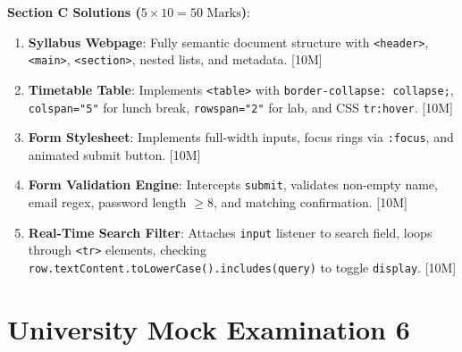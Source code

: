 \begin{solutionbox}
\medskip
\noindent\textbf{Section C Solutions ($5 \times 10 = 50\text{ Marks}$)}:
\begin{enumerate}[start=17]
    \item \textbf{Syllabus Webpage}: Fully semantic document structure with \texttt{<header>}, \texttt{<main>}, \texttt{<section>}, nested lists, and metadata. [10M]
    \item \textbf{Timetable Table}: Implements \texttt{<table>} with \texttt{border-collapse: collapse;}, \texttt{colspan="5"} for lunch break, \texttt{rowspan="2"} for lab, and CSS \texttt{tr:hover}. [10M]
    \item \textbf{Form Stylesheet}: Implements full-width inputs, focus rings via \texttt{:focus}, and animated submit button. [10M]
    \item \textbf{Form Validation Engine}: Intercepts \texttt{submit}, validates non-empty name, email regex, password length $\ge 8$, and matching confirmation. [10M]
    \item \textbf{Real-Time Search Filter}: Attaches \texttt{input} listener to search field, loops through \texttt{<tr>} elements, checking \texttt{row.textContent.toLowerCase().includes(query)} to toggle \texttt{display}. [10M]
\end{enumerate}
\end{solutionbox}

\section{University Mock Examination 6}

